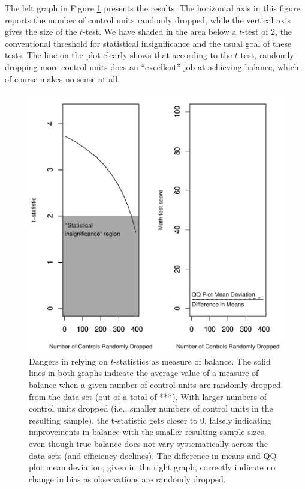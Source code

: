 \documentclass[11pt,titlepage]{article}
\begin{document}
The left graph in Figure \ref{f:randrop} presents the results.  The
horizontal axis in this figure reports the number of control units
randomly dropped, while the vertical axis gives the size of the
$t$-test.  We have shaded in the area below a $t$-test of 2, the
conventional threshold for statistical insignificance and the usual
goal of these tests.  The line on the plot clearly shows that
according to the $t$-test, randomly dropping more control units does
an ``excellent'' job at achieving balance, which of course makes no
sense at all.
\begin{figure}[t]
  \centering
  \includegraphics[height=4.5in]{figs/TStatPlotR0MATH}
  \caption{Dangers in relying on $t$-statistics as measure of balance.
    The solid lines in both graphs indicate the average value of a
    measure of balance when a given number of control units are
    randomly dropped from the data set (out of a total of ***).  With
    larger numbers of control units dropped (i.e., smaller numbers of
    control units in the resulting sample), the t-statistic gets
    closer to 0, falsely indicating improvements in balance with the
    smaller resulting sample sizes, even though true balance does not
    vary systematically across the data sets (and efficiency
    declines).  The difference in means and QQ plot mean deviation,
    given in the right graph, correctly indicate no change in bias as
    observations are randomly dropped.}
  \label{f:randrop}
\end{figure}
\end{document}
